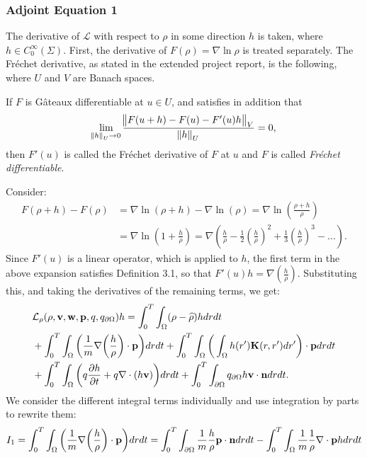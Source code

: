 \subsubsection{Adjoint Equation 1}

The derivative of $\mathcal{L}$ with respect to $\rho$ in some direction $h$ is taken, where ${h} \in C_0^\infty(\Sigma) $.
First, the derivative of $F(\rho) = \nabla \ln \rho $ is treated separately. The Fr\'echet derivative, as stated in the extended project report, is the following, where $U$ and $V$ are Banach spaces.
\theoremstyle{definition}
\begin{definition}\cite{DeLosReyesOptimization}
	If $F$ is G\^{a}teaux differentiable at $u \in U$, and satisfies in addition that
	\begin{align*}
	\lim_{\norm{h}_U \to 0} \frac{\norm{F(u+h)-F(u) -F'(u)h}_V}{\norm{h}_U}=0,
	\end{align*}
	then $F'(u)$ is called the Fr\'echet derivative of $F$ at $u$ and $F$ is called \emph{Fr\'echet differentiable}.
\end{definition}
Consider:
\begin{align*}
F(\rho + h) - F(\rho) &= \nabla \ln(\rho +h) - \nabla \ln(\rho)  = \nabla \ln \left(\frac{\rho + h}{\rho}\right) \\
&= \nabla \ln\left(1 + \frac{h}{\rho}\right) = \nabla \left(\frac{h}{\rho} - \frac{1}{2}\left(\frac{h}{\rho}\right)^2 + \frac{1}{3}\left(\frac{h}{\rho}\right)^3 - ...\right).
\end{align*}
Since $F'(u)$ is a linear operator, which is applied to $h$, the first term in the above expansion satisfies Definition 3.1, so that $F'(u)h = \nabla \left(\frac{h}{\rho} \right)$. 
Substituting this, and taking the derivatives of the remaining terms, we get:
\begin{align*}
&\mathcal{L}_\rho(\rho,\mathbf{v},\mathbf{w},\mathbf{p},q,{q}_{\partial \Omega})h = \int_0^T \int_\Omega  (\rho - \widehat \rho)h drdt \\
&+ \int_0^T \int_\Omega \bigg( \frac{1}{m}\nabla \bigg(\frac{h}{\rho}\bigg)\cdot \mathbf{p} \bigg)  dr dt + \int_0^T \int_\Omega \bigg(\int_\Omega h(r') \mathbf{K}(r,r') dr'\bigg) \cdot \mathbf{p} dr dt\\
& + \int_0^T \int_\Omega \bigg(q\frac{\partial h}{\partial t} + q\nabla \cdot (h \mathbf{v})\bigg)  dr dt +\int_0^T \int_{\partial\Omega} {q}_{\partial \Omega} h \mathbf{v} \cdot \mathbf{n}  dr dt.
\end{align*}
We consider the different integral terms individually and use integration by parts to rewrite them:
\begin{align*}
I_1 = \int_0^T \int_\Omega \bigg( \frac{1}{m}\nabla \bigg(\frac{h}{\rho}\bigg)\cdot \mathbf{p} \bigg)  dr dt  = \int_0^T \int_{\partial \Omega} \frac{1}{m} \frac{h}{\rho} \mathbf{p} \cdot \mathbf{n} dr dt - \int_0^T \int_\Omega \frac{1}{m} \frac{1}{\rho}\nabla \cdot \mathbf{p} h dr dt 
\end{align*}
